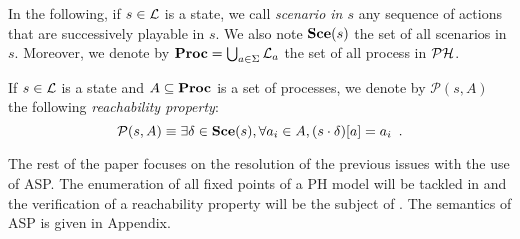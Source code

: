 In the following, if $s \in \mathcal{L}$ is a state,
we call \emph{scenario in $s$}
any sequence of actions that are successively playable in $s$.
We also note $\mathbf{Sce}(s)$ the set of all scenarios in $s$.
Moreover, we denote by $\mathbf{Proc} = \bigcup_{a \in \Sigma} \mathcal{L}_a$
the set of all process in $\mathcal{PH}$.

\begin{definition}
\label{def:reachability}
  If $s \in \mathcal{L}$ is a state and $A \subseteq \mathbf{Proc}$ is a set of processes,
  we denote by $\mathcal{P}(s, A)$ the following \emph{reachability property}:
  \[\mathcal{P}(s, A) \equiv \exists \delta \in \mathbf{Sce}(s), \forall a_i \in A, {(s \cdot \delta)[a]} = a_i
    \enspace.\]
\end{definition}

The rest of the paper focuses on the resolution of the previous issues
with the use of ASP.
The enumeration of all fixed points of a PH model will be tackled in
and the verification of a reachability property will be the subject of
.
The semantics of ASP is given in Appendix.
